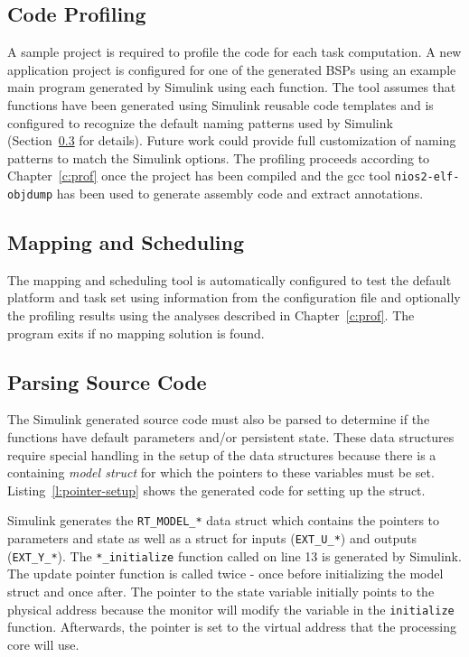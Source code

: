 \subsection{Code Profiling}

	A sample project is required to profile the code for each task computation. 
	A new application project is configured for one of the generated BSPs using an example main program generated by Simulink using each function. 
	The tool assumes that functions have been generated using Simulink reusable code templates and is configured to recognize the default naming patterns used by Simulink (Section~\ref{s:parse-source} for details).
	Future work could provide full customization of naming patterns to match the Simulink options. 
	The profiling proceeds according to Chapter~\ref{c:prof} once the project has been compiled and the gcc tool \texttt{nios2-elf-objdump} has been used to generate assembly code and extract annotations.

\subsection{Mapping and Scheduling}
	The mapping and scheduling tool is automatically configured to test the default platform and task set using information from the configuration file and optionally the profiling results using the analyses described in Chapter~\ref{c:prof}.
	The program exits if no mapping solution is found.

\subsection{Parsing Source Code}
\label{s:parse-source}
	The Simulink generated source code must also be parsed to determine if the functions have default parameters and/or persistent state. 
	These data structures require special handling in the setup of the data structures because there is a containing \emph{model struct} for which the pointers to these variables must be set. 
	Listing~\ref{l:pointer-setup} shows the generated code for setting up the struct.
	
	
	Simulink generates the \texttt{RT\_MODEL\_*} data struct which contains the pointers to parameters and state as well as a struct for inputs (\texttt{EXT\_U\_*}) and outputs (\texttt{EXT\_Y\_*}). 
	The \texttt{*\_initialize} function called on line 13 is generated by Simulink. The update pointer function is called twice - once before initializing the model struct and once after. 
	The pointer to the state variable initially points to the physical address because the monitor will modify the variable in the \texttt{initialize} function. 
	Afterwards, the pointer is set to the virtual address that the processing core will use.

